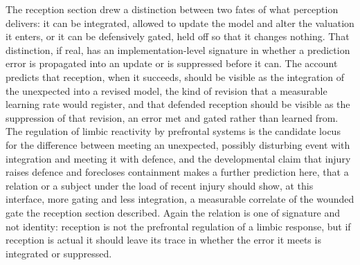 The reception section drew a distinction between two fates of what perception delivers: it can be integrated, allowed to update the model and alter the valuation it enters, or it can be defensively gated, held off so that it changes nothing. That distinction, if real, has an implementation-level signature in whether a prediction error is propagated into an update or is suppressed before it can. The account predicts that reception, when it succeeds, should be visible as the integration of the unexpected into a revised model, the kind of revision that a measurable learning rate would register, and that defended reception should be visible as the suppression of that revision, an error met and gated rather than learned from. The regulation of limbic reactivity by prefrontal systems is the candidate locus for the difference between meeting an unexpected, possibly disturbing event with integration and meeting it with defence, and the developmental claim that injury raises defence and forecloses containment makes a further prediction here, that a relation or a subject under the load of recent injury should show, at this interface, more gating and less integration, a measurable correlate of the wounded gate the reception section described. Again the relation is one of signature and not identity: reception is not the prefrontal regulation of a limbic response, but if reception is actual it should leave its trace in whether the error it meets is integrated or suppressed.

